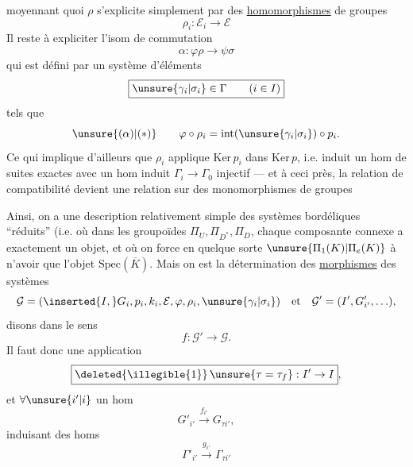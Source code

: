 
moyennant quoi $\rho$ s'explicite simplement par des
\uline{homomorphismes} de groupes
\[
\boxed{\rho_i:\mathcal E_i\longrightarrow\mathcal E}
\]
Il reste à expliciter l'isom de commutation
\[
\alpha:\varphi\rho\to\psi\sigma
\]
qui est défini par un système d'éléments
\[
\boxed{\unsure{\gamma_i|\sigma_i}\in\Gamma\qquad(i\in I)}
\]
tels que
\[
\unsure{(\alpha)|(*)}\qquad
\varphi\circ\rho_i=\mathrm{int}(\unsure{\gamma_i|\sigma_i})\circ p_i.
\]
Ce qui implique d'ailleurs que $\rho_i$ 
applique $\mathrm{Ker}\,p_i$ dans $\mathrm{Ker}\,p$, i.e. induit
un hom de suites exactes
avec un hom induit $\Gamma_i\to\Gamma_0$ injectif
--- et à ceci près, la relation de compatibilité
\unsure{$(\alpha)$|$(*)$} devient une relation sur des
monomorphismes de groupes



Ainsi, on a une description relativement simple des systèmes
bordéliques ``réduits'' (i.e. où dans les groupoïdes
$\Pi_U,\Pi_{D^*},\Pi_D$, chaque composante connexe a exactement
un objet, et où  on force en quelque sorte
$\unsure{\Pi_1(K)|\Pi_e(K)}$ à n'avoir que l'objet
$\mathrm{Spec}(\overline K)$.
Mais on est  
 la détermination des \uline{morphismes} des systèmes
\[
\mathcal G=(\inserted{I,}G_i,p_i,k_i,\mathcal E,\varphi,\rho_i,
\unsure{\gamma_i|\sigma_i})
\quad\hbox{et}\quad
\mathcal G'=(I',G'_{i'},\ldots),
\]
 disons dans le sens
\[
f:\mathcal G'\to\mathcal G.
\]
Il faut donc  une application
\[
\boxed{\deleted{\illegible{1}}\,\unsure{\tau=\tau_f}:I'\to I},
\]
et $\forall\unsure{i'|i}$ un hom
\[
\boxed{G'_{i'}\xrightarrow{f_{i'}}G_{\tau i'}},
\]
induisant  des homs
\[
\Gamma'_{i'}\xrightarrow{g_{i'}}\Gamma_{\tau i'}
\]


